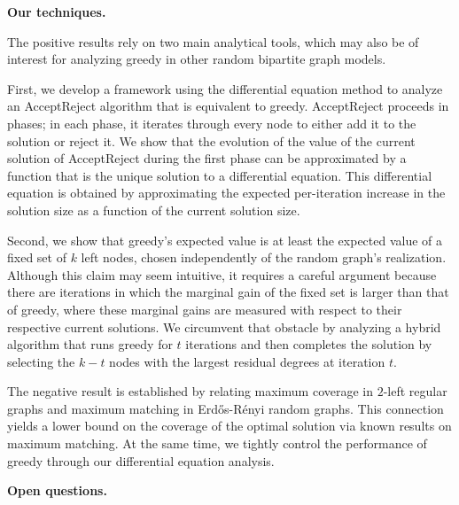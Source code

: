 \par\medskip\noindent\textbf{Our techniques.}\par




The positive results rely on two main analytical tools, which may also be of interest for analyzing greedy in other random bipartite graph models.\par




First, we develop a framework using the differential equation method to analyze an AcceptReject algorithm that is equivalent to greedy. AcceptReject proceeds in phases; in each phase, it iterates through every node to either add it to the solution or reject it. We show that the evolution of the value of the current solution of AcceptReject during the first phase can be approximated by a function that is the unique solution to a differential equation. This differential equation is obtained by approximating the expected per-iteration increase in the solution size as a function of the current solution size.\par




Second, we show that greedy’s expected value is at least the expected value of a fixed set of $k$ left nodes, chosen independently of the random graph’s realization.
Although this claim may seem intuitive, it requires a careful argument because there are iterations in which the marginal gain of the fixed set is larger than that of greedy, where these marginal gains are measured with respect to their respective current solutions. We circumvent that obstacle by analyzing a hybrid algorithm that runs greedy for $t$ iterations and then completes the solution by selecting the $k-t$ nodes with the largest residual degrees at iteration $t$.\par




The negative result is established by relating maximum coverage in $2$-left regular graphs and maximum matching in Erdős-Rényi random graphs. This connection yields a lower bound on the coverage of the optimal solution via known results on maximum matching. At the same time, we tightly control the performance of greedy through our differential equation analysis.\par





\par\medskip\noindent\textbf{Open questions.}\par




